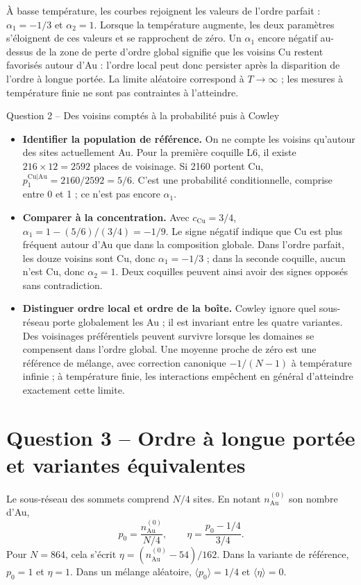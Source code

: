 \documentclass[10pt,a4paper]{article}
\newcommand{\Au}{\mathrm{Au}}
\newcommand{\Cu}{\mathrm{Cu}}
\begin{document}
À basse température, les courbes rejoignent les valeurs de l'ordre parfait :
$\alpha_1=-1/3$ et $\alpha_2=1$. Lorsque la température augmente,
les deux paramètres s'éloignent de ces valeurs et se rapprochent de zéro.
Un $\alpha_1$ encore négatif au-dessus de la zone de perte d'ordre global
signifie que les voisins Cu restent favorisés autour d'Au : l'ordre local
peut donc persister après la disparition de l'ordre à longue portée.
La limite aléatoire correspond à $T\to\infty$ ; les mesures à
température finie ne sont pas contraintes à l'atteindre.

\begin{oral}{Question 2 -- Des voisins comptés à la probabilité puis à Cowley}
\begin{itemize}
\item \textbf{Identifier la population de référence.} On ne compte les
voisins qu'autour des sites actuellement Au. Pour la première coquille L6,
il existe $216\times12=2592$ places de voisinage. Si 2160 portent Cu,
$p_1^{\Cu|\Au}=2160/2592=5/6$. C'est une probabilité conditionnelle,
comprise entre 0 et 1 ; ce n'est pas encore $\alpha_1$.
\item \textbf{Comparer à la concentration.} Avec $c_{\Cu}=3/4$,
$\alpha_1=1-(5/6)/(3/4)=-1/9$. Le signe négatif indique que Cu est
plus fréquent autour d'Au que dans la composition globale. Dans l'ordre
parfait, les douze voisins sont Cu, donc $\alpha_1=-1/3$ ; dans la
seconde coquille, aucun n'est Cu, donc $\alpha_2=1$. Deux coquilles
peuvent ainsi avoir des signes opposés sans contradiction.
\item \textbf{Distinguer ordre local et ordre de la boîte.} Cowley ignore
quel sous-réseau porte globalement les Au ; il est invariant entre les
quatre variantes. Des voisinages préférentiels peuvent survivre lorsque
les domaines se compensent dans l'ordre global. Une moyenne proche de
zéro est une référence de mélange, avec correction canonique
$-1/(N-1)$ à température infinie ; à température finie, les interactions
empêchent en général d'atteindre exactement cette limite.
\end{itemize}
\end{oral}

\section{Question 3 -- Ordre à longue portée et variantes équivalentes}
Le sous-réseau des sommets comprend $N/4$ sites. En notant
$n_{\Au}^{(0)}$ son nombre d'Au,
\[
p_0=\frac{n_{\Au}^{(0)}}{N/4},\qquad
\boxed{\eta=\frac{p_0-1/4}{3/4}}.
\]
Pour $N=864$, cela s'écrit $\eta=(n_{\Au}^{(0)}-54)/162$.
Dans la variante de référence, $p_0=1$ et $\eta=1$. Dans un mélange
aléatoire, $\langle p_0\rangle=1/4$ et $\langle\eta\rangle=0$.
\end{document}
